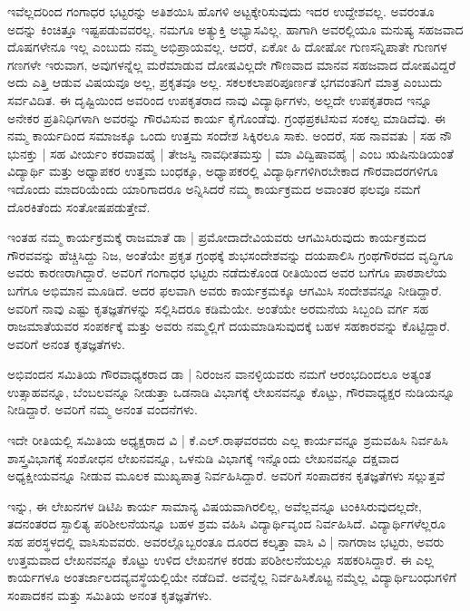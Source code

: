 {ಇವೆಲ್ಲದರಿಂದ ಗಂಗಾಧರ ಭಟ್ಟರನ್ನು ಅತಿಶಯಿಸಿ ಹೊಗಳಿ ಅಟ್ಟಕ್ಕೇರಿಸುವುದು ಇದರ ಉದ್ದೇಶವಲ್ಲ. ಅವರಂತೂ ಅದನ್ನು ಕಿಂಚಿತ್ತೂ ಇಷ್ಟಪಡುವವರಲ್ಲ. ನಮಗೂ ಅತ್ಯುಕ್ತಿ ಅಭ್ಯಾಸವಿಲ್ಲ. ಹಾಗಾಗಿ ಅವರಲ್ಲಿಯೂ ಮನುಷ್ಯ ಸಹಜವಾದ ದೊಷಗಳೇನೂ ಇಲ್ಲ ಎಂಬುದು ನಮ್ಮ ಅಭಿಪ್ರಾಯವಲ್ಲ. ಆದರೆ, ಏಕೋ ಹಿ ದೋಷೋ ಗುಣಸನ್ನಿಪಾತೇ \enginline{-} ಗುಣಗಳ ಗಣಗಳೇ ಇರುವಾಗ, ಅವುಗಳನ್ನೆಲ್ಲ ಮರೆಮಾಡುವ ದೋಷವಿಲ್ಲದೇ ಗೌಣವಾದ ಮಾನವ ಸಹಜವಾದ ದೋಷವಿದ್ದರೆ ಅದು ಎತ್ತಿ ಆಡುವ ವಿಷಯವೂ ಅಲ್ಲ, ಪ್ರಕೃತವೂ ಅಲ್ಲ. ಸಕಲಕಲಾಪರಿಪೂರ್ಣತೆ ಭಗವಂತನಿಗೆ ಮಾತ್ರ  ಎಂಬುದು ಸರ್ವವಿದಿತ. ಈ ದೃಷ್ಟಿಯಿಂದ ಅವರಿಂದ ಉಪಕೃತರಾದ ನಾವು \enginline{-} ವಿದ್ಯಾರ್ಥಿಗಳು, ಅಲ್ಲದೇ ಉಪಕೃತರಾದ ಇನ್ನೂ ಅನೇಕರ ಪ್ರತಿನಿಧಿಗಳಾಗಿ ಅವರನ್ನು ಗೌರವಿಸುವ ಕಾರ್ಯ ಕೈಗೊಂಡೆವು. ಗ್ರಂಥಪ್ರಕಟಿಸುವ ಸಂಕಲ್ಪ ಮಾಡಿದೆವು. ಈ ನಮ್ಮ ಕಾರ್ಯದಿಂದ ಸಮಾಜಕ್ಕೂ ಒಂದು  ಉತ್ತಮ ಸಂದೇಶ ಸಿಕ್ಕಿರಲೂ ಸಾಕು. ಅಂದರೆ, ಸಹ ನಾವವತು | ಸಹ ನೌ ಭುನಕ್ತು | ಸಹ ವೀರ್ಯಂ ಕರವಾವಹೈ | ತೇಜಸ್ವಿ  ನಾವಧೀತಮಸ್ತು | ಮಾ ವಿದ್ವಿಷಾವಹೈ | ಎಂಬ ಋಷಿನುಡಿಯಂತೆ ವಿದ್ಯಾರ್ಥಿ ಮತ್ತು ಅಧ್ಯಾಪಕರ ಉತ್ತಮ ಬಂಧಕ್ಕೂ, ಅಧ್ಯಾಪಕರಲ್ಲಿ ವಿದ್ಯಾರ್ಥಿಗಳಿಗಿರಬೇಕಾದ ಗೌರವಾದರಗಳಿಗೂ ಇದೊಂದು ಮಾದರಿಯೆಂದು ಯಾರಿಗಾದರೂ ಅನ್ನಿಸಿದರೆ ನಮ್ಮ ಕಾರ್ಯಕ್ರಮದ ಅವಾಂತರ ಫಲವೂ ನಮಗೆ ದೊರಕಿತೆಂದು ಸಂತೋಷಪಡುತ್ತೇವೆ.

ಇಂತಹ ನಮ್ಮ ಕಾರ್ಯಕ್ರಮಕ್ಕೆ ರಾಜಮಾತೆ ಡಾ | ಪ್ರಮೋದಾದೇವಿಯವರು ಆಗಮಿಸಿರುವುದು ಕಾರ್ಯಕ್ರಮದ ಗೌರವವನ್ನು ಹೆಚ್ಚಿಸಿದ್ದು ನಿಜ, ಅಂತೆಯೇ ಪ್ರಕೃತ ಗ್ರಂಥಕ್ಕೆ ಶುಭಸಂದೇಶವನ್ನು ದಯಪಾಲಿಸಿ ಗ್ರಂಥಗೌರವದ ವೃದ್ಧಿಗೂ ಅವರು ಕಾರಣರಾಗಿದ್ದಾರೆ. ಅವರಿಗೆ ಗಂಗಾಧರ ಭಟ್ಟರು ನಡೆದುಕೊಂಡ ರೀತಿಯಿಂದ ಅವರ ಬಗೆಗೂ ಪಾಠಶಾಲೆಯ ಬಗೆಗೂ  ಅಭಿಮಾನ ಮೂಡಿದೆ. ಅದರ ಫಲವಾಗಿ ಅವರು ಕಾರ್ಯಕ್ರಮಕ್ಕೂ ಆಗಮಿಸಿ ಸಂದೇಶವನ್ನೂ ನೀಡಿದ್ದಾರೆ. ಅವರಿಗೆ ನಾವು ಎಷ್ಟು ಕೃತಜ್ಞತೆಗಳನ್ನು ಸಲ್ಲಿಸಿದರೂ ಕಡಿಮೆಯೇ. ಅಂತೆಯೇ ಅರಮನೆಯ ಸಿಬ್ಬಂದಿ ವರ್ಗ ಸಹ ರಾಜಮಾತೆಯವರ ಸಂಪರ್ಕಕ್ಕೆ ಮತ್ತು ಅವರು ನಮ್ಮಲ್ಲಿಗೆ ದಯಮಾಡಿಸುವುದಕ್ಕೆ ಬಹಳ ಸಹಕಾರವನ್ನು ಕೊಟ್ಟಿದ್ದಾರೆ. ಅವರಿಗೆ ಅನಂತ ಕೃತಜ್ಞತೆಗಳು.

ಅಭಿವಂದನ ಸಮಿತಿಯ ಗೌರವಾಧ್ಯಕರಾದ ಡಾ | ನಿರಂಜನ ವಾನಳ್ಳಿಯವರು ನಮಗೆ ಆರಂಭದಿಂದಲೂ ಅತ್ಯಂತ ಉತ್ಸಾಹವನ್ನೂ, ಬೆಂಬಲವನ್ನೂ ನೀಡುತ್ತಾ ಒಡನಾಡಿ ವಿಭಾಗಕ್ಕೆ ಲೇಖನವನ್ನೂ ಕೊಟ್ಟು, ಗೌರವಾಧ್ಯಕ್ಷರ ನುಡಿಯನ್ನೂ ನೀಡಿದ್ದಾರೆ. ಅವರಿಗೆ ನಮ್ಮ ಅನಂತ ವಂದನೆಗಳು.

ಇದೇ ರೀತಿಯಲ್ಲಿ ಸಮಿತಿಯ ಅಧ್ಯಕ್ಷರಾದ ವಿ | ಕೆ.ಎಲ್.ರಾಘವರವರು ಎಲ್ಲ ಕಾರ್ಯವನ್ನೂ ಶ್ರಮವಹಿಸಿ ನಿರ್ವಹಿಸಿ ಶಾಸ್ತ್ರವಿಭಾಗಕ್ಕೆ ಸಂಶೋಧನ ಲೇಖನವನ್ನೂ, ಒಳನುಡಿ ವಿಭಾಗಕ್ಕೆ ಇನ್ನೊಂದು ಲೇಖನವನ್ನೂ ದಕ್ಷವಾದ ಅಧ್ಯಕ್ಷೀಯವನ್ನೂ ನೀಡುವ ಮೂಲಕ ಮುಖ್ಯಪಾತ್ರ ನಿರ್ವಹಿಸಿದ್ದಾರೆ. ಅವರಿಗೆ ಸಂಪಾದಕನ ಕೃತಜ್ಞತೆಗಳು ಸಲ್ಲುತ್ತವೆ

ಇನ್ನು, ಈ ಲೇಖನಗಳ ಡಿಟಿಪಿ ಕಾರ್ಯ ಸಾಮಾನ್ಯ ವಿಷಯವಾಗಿರಲಿಲ್ಲ, ಅವೆಲ್ಲವನ್ನೂ ಟಂಕಿಸಿರುವುದಲ್ಲದೇ, ತದನಂತರದ ಸ್ಖಾಲಿತ್ಯ ಪರಿಶೀಲನೆಯನ್ನೂ ಬಹಳ ಶ್ರಮ ವಹಿಸಿ ವಿದ್ಯಾರ್ಥಿವೃಂದ ನಿರ್ವಹಿಸಿದೆ. ವಿದ್ಯಾರ್ಥಿಗಳೆಲ್ಲರೂ ಸಹ ಪರಸ್ಥಳದಲ್ಲಿ ವಾಸಿಸುವವರು. ಅವರಲ್ಲೊಬ್ಬರಂತೂ ದೂರದ ಕಲ್ಕತ್ತಾ ವಾಸಿ \enginline{-} ವಿ | ನಾಗರಾಜ ಭಟ್ಟರು, ಅವರು ಉತ್ತಮವಾದ ಲೇಖನವನ್ನೂ ಕೊಟ್ಟು ಉಳಿದ ಲೇಖನಗಳ ಕರಡು ಪರಿಶೀಲನೆಯಲ್ಲೂ ಸಹಕರಿಸಿದ್ದಾರೆ. ಈ ಎಲ್ಲ ಕಾರ್ಯಗಳೂ ಅಂತರ್ಜಾಲದ\break ವ್ಯವಸ್ಥೆಯಲ್ಲಿಯೇ ನಡೆದಿವೆ. ಅವನ್ನೆಲ್ಲ ನಿರ್ವಹಿಸಿಕೊಟ್ಟ ನಮ್ಮೆಲ್ಲ ವಿದ್ಯಾರ್ಥಿ\break ಬಂಧುಗಳಿಗೆ ಸಂಪಾದಕನ ಮತ್ತು ಸಮಿತಿಯ ಅನಂತ ಕೃತಜ್ಞತೆಗಳು. 

}
